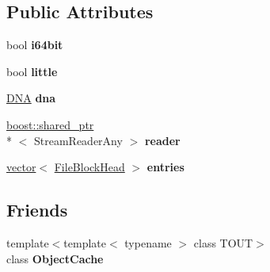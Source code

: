 \subsection*{Public Attributes}
\begin{DoxyCompactItemize}
\item 
\hypertarget{class_assimp_1_1_blender_1_1_file_database_a90c407ff8b5b9902ba51f036f2dccd15}{bool {\bfseries i64bit}}\label{class_assimp_1_1_blender_1_1_file_database_a90c407ff8b5b9902ba51f036f2dccd15}

\item 
\hypertarget{class_assimp_1_1_blender_1_1_file_database_a24253deb6210e34173ae813de057c03b}{bool {\bfseries little}}\label{class_assimp_1_1_blender_1_1_file_database_a24253deb6210e34173ae813de057c03b}

\item 
\hypertarget{class_assimp_1_1_blender_1_1_file_database_a48214261ff4bf7ffd4f5dfe45579b8b7}{\hyperlink{class_assimp_1_1_blender_1_1_d_n_a}{D\+N\+A} {\bfseries dna}}\label{class_assimp_1_1_blender_1_1_file_database_a48214261ff4bf7ffd4f5dfe45579b8b7}

\item 
\hypertarget{class_assimp_1_1_blender_1_1_file_database_a0d2f0ac1acc0357afcdb5f9642696257}{\hyperlink{classboost_1_1shared__ptr}{boost\+::shared\+\_\+ptr}\\*
$<$ Stream\+Reader\+Any $>$ {\bfseries reader}}\label{class_assimp_1_1_blender_1_1_file_database_a0d2f0ac1acc0357afcdb5f9642696257}

\item 
\hypertarget{class_assimp_1_1_blender_1_1_file_database_a97ba9393bcd9fc9fa73489bd4325a2cc}{\hyperlink{class_assimp_1_1_blender_1_1vector}{vector}$<$ \hyperlink{struct_assimp_1_1_blender_1_1_file_block_head}{File\+Block\+Head} $>$ {\bfseries entries}}\label{class_assimp_1_1_blender_1_1_file_database_a97ba9393bcd9fc9fa73489bd4325a2cc}

\end{DoxyCompactItemize}
\subsection*{Friends}
\begin{DoxyCompactItemize}
\item 
\hypertarget{class_assimp_1_1_blender_1_1_file_database_a48243f0835295529aaf2c25f8ea9d3f6}{{\footnotesize template$<$template$<$ typename $>$ class T\+O\+U\+T$>$ }\\class {\bfseries Object\+Cache}}\label{class_assimp_1_1_blender_1_1_file_database_a48243f0835295529aaf2c25f8ea9d3f6}

\end{DoxyCompactItemize}


